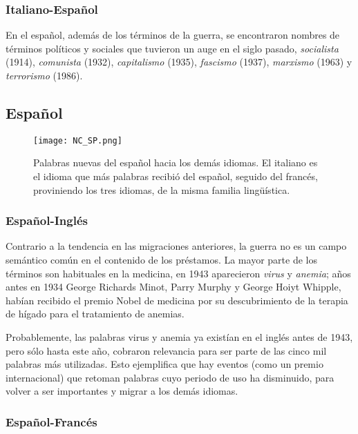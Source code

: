 \subsubsection*{Italiano-Español}%

En el español, además de los términos de la guerra, se encontraron nombres de términos políticos y sociales que tuvieron un auge en el siglo pasado,  \textit{socialista} (1914), \textit{comunista} (1932), \textit{capitalismo} (1935), \textit{fascismo} (1937),  \textit{marxismo} (1963) y \textit{terrorismo} (1986). 

\subsection{Español}%

\begin{figure} %
	\centering
	\texttt{[image: NC\_SP.png]}
	\label{fig.NC_SP}
	\caption{Palabras nuevas del español hacia los demás idiomas. El italiano es el idioma  que más palabras recibió del español, seguido del francés, proviniendo los tres idiomas, de la misma familia lingüística. }
\end{figure} %

\subsubsection*{Español-Inglés}%

Contrario a la tendencia en las migraciones anteriores, la guerra no es un campo semántico común en el contenido de los préstamos. La mayor parte de los términos son habituales en la medicina,  en 1943  aparecieron  \textit{virus} y \textit{anemia};  años antes en 1934 George Richards Minot, Parry Murphy y George Hoiyt Whipple, habían recibido el premio Nobel de medicina por su descubrimiento de la terapia de hígado para el tratamiento de anemias.   

Probablemente, las palabras virus y anemia ya existían en el inglés antes de 1943,  pero sólo hasta este año,  cobraron relevancia para ser parte de las cinco mil palabras más utilizadas. Esto ejemplifica que hay eventos (como un premio internacional) que retoman palabras cuyo periodo de uso  ha disminuido,  para volver a ser importantes y migrar a los demás idiomas.


\subsubsection*{Español-Francés}%

